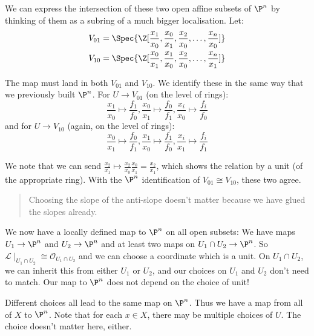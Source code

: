 We can express the intersection of these two open affine subsets of $\P^n$ by thinking of them as a subring of a much bigger localisation.
Let:
\begin{align*}
    V_{01}&=\Spec{\Z[\frac{x_1}{x_0},\frac{x_0}{x_1},\frac{x_2}{x_0},\dots,\frac{x_n}{x_0}]}\\
    V_{10}&=\Spec{\Z[\frac{x_0}{x_1},\frac{x_1}{x_0},\frac{x_2}{x_0},\dots,\frac{x_n}{x_1}]}
\end{align*}

The map must land in both $V_{01}$ and $V_{10}$.
We identify these in the same way that we previously built $\P^n$.
For $U\to V_{01}$ (on the level of rings):
\begin{equation*}
    \frac{x_1}{x_0}\mapsto\frac{f_1}{f_0},\frac{x_0}{x_1}\mapsto\frac{f_0}{f_1},\frac{x_i}{x_0}\mapsto\frac{f_i}{f_0}
\end{equation*}
and for $U\to V_{10}$ (again, on the level of rings):
\begin{equation*}
    \frac{x_0}{x_1}\mapsto\frac{f_0}{f_1},\frac{x_1}{x_0}\mapsto\frac{f_1}{f_0},\frac{x_i}{x_1}\mapsto\frac{f_i}{f_1}
\end{equation*}

We note that we can send $\frac{x_2}{x_1}\mapsto\frac{x_2}{x_0}\frac{x_0}{x_1}=\frac{x_2}{x_1}$, which shows the relation by a unit (of the appropriate ring).
With the $\P^n$ identification of $V_{01}\cong V_{10}$, these two agree.
\begin{quote}
    Choosing the slope of the anti-slope doesn't matter because we have glued the slopes already.
\end{quote}

We now have a locally defined map to $\P^n$ on all open subsets:
We have maps $U_1\to\P^n$ and $U_2\to\P^n$ and at least two maps on $U_1\cap U_2\to\P^n$.
So $\mathcal{L}\mid_{U_1\cap U_2}\cong\mathcal{O}_{U_1\cap U_2}$ and we can choose a coordinate which is a unit.
On $U_1\cap U_2$, we can inherit this from either $U_1$ or $U_2$, and our choices on $U_1$ and $U_2$ don't need to match.
Our map to $\P^n$ does not depend on the choice of unit!

Different choices all lead to the same map on $\P^n$. Thus we have a map from all of $X$ to $\P^n$.
Note that for each $x\in X$, there may be multiple choices of $U$. The choice doesn't matter here, either.

